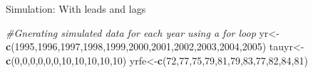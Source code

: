 \documentclass[
  ignorenonframetext,
]{beamer}
\newenvironment{Shaded}{\begin{snugshade}}{\end{snugshade}}
\newcommand{\CommentTok}[1]{\textcolor[rgb]{0.56,0.35,0.01}{\textit{#1}}}
\newcommand{\DecValTok}[1]{\textcolor[rgb]{0.00,0.00,0.81}{#1}}
\newcommand{\FunctionTok}[1]{\textcolor[rgb]{0.13,0.29,0.53}{\textbf{#1}}}
\newcommand{\NormalTok}[1]{#1}
\newcommand{\OtherTok}[1]{\textcolor[rgb]{0.56,0.35,0.01}{#1}}
\begin{document}
\begin{frame}[fragile]{Simulation: With leads and lags}
\protect\hypertarget{simulation-with-leads-and-lags-1}{}
\tiny

\begin{Shaded}
\begin{Highlighting}[]
\CommentTok{\#Gnerating simulated data for each year using a for loop}
\NormalTok{yr}\OtherTok{\textless{}{-}}\FunctionTok{c}\NormalTok{(}\DecValTok{1995}\NormalTok{,}\DecValTok{1996}\NormalTok{,}\DecValTok{1997}\NormalTok{,}\DecValTok{1998}\NormalTok{,}\DecValTok{1999}\NormalTok{,}\DecValTok{2000}\NormalTok{,}\DecValTok{2001}\NormalTok{,}\DecValTok{2002}\NormalTok{,}\DecValTok{2003}\NormalTok{,}\DecValTok{2004}\NormalTok{,}\DecValTok{2005}\NormalTok{)}
\NormalTok{tauyr}\OtherTok{\textless{}{-}}\FunctionTok{c}\NormalTok{(}\DecValTok{0}\NormalTok{,}\DecValTok{0}\NormalTok{,}\DecValTok{0}\NormalTok{,}\DecValTok{0}\NormalTok{,}\DecValTok{0}\NormalTok{,}\DecValTok{0}\NormalTok{,}\DecValTok{10}\NormalTok{,}\DecValTok{10}\NormalTok{,}\DecValTok{10}\NormalTok{,}\DecValTok{10}\NormalTok{,}\DecValTok{10}\NormalTok{)}
\NormalTok{yrfe}\OtherTok{\textless{}{-}}\FunctionTok{c}\NormalTok{(}\DecValTok{72}\NormalTok{,}\DecValTok{77}\NormalTok{,}\DecValTok{75}\NormalTok{,}\DecValTok{79}\NormalTok{,}\DecValTok{81}\NormalTok{,}\DecValTok{79}\NormalTok{,}\DecValTok{83}\NormalTok{,}\DecValTok{77}\NormalTok{,}\DecValTok{82}\NormalTok{,}\DecValTok{84}\NormalTok{,}\DecValTok{81}\NormalTok{)}




\end{Highlighting}
\end{Shaded}
\end{frame}
\end{document}
